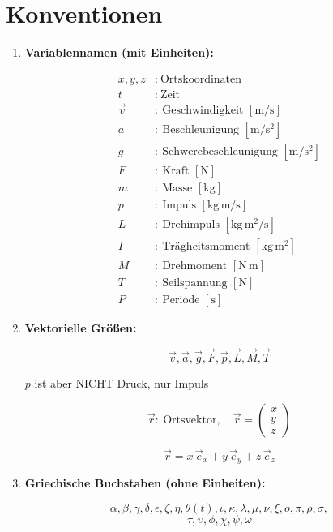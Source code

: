 \documentclass[a4paper,12pt]{article}
\begin{document}
\section*{Konventionen}

\begin{enumerate}

\item \textbf{Variablennamen (mit Einheiten):}

\begin{align*}
x, y, z &:\ \text{Ortskoordinaten} \\[4pt]
t &:\ \text{Zeit} \\[4pt]
\vec{v} &:\ \text{Geschwindigkeit } [\mathrm{m/s}] \\[4pt]
a &:\ \text{Beschleunigung } [\mathrm{m/s^2}] \\[4pt]
g &:\ \text{Schwerebeschleunigung } [\mathrm{m/s^2}] \\[4pt]
F &:\ \text{Kraft } [\mathrm{N}] \\[4pt]
m &:\ \text{Masse } [\mathrm{kg}] \\[4pt]
p &:\ \text{Impuls } [\mathrm{kg\,m/s}] \\[4pt]
L &:\ \text{Drehimpuls } [\mathrm{kg\,m^2/s}] \\[4pt]
I &:\ \text{Trägheitsmoment } [\mathrm{kg\,m^2}] \\[4pt]
M &:\ \text{Drehmoment } [\mathrm{N\,m}] \\[4pt]
T &:\ \text{Seilspannung } [\mathrm{N}] \\[4pt]
P &:\ \text{Periode } [\mathrm{s}]
\end{align*}

\item \textbf{Vektorielle Größen:}

\[
\vec{v}, \vec{a}, \vec{g}, \vec{F}, \vec{p}, \vec{L}, \vec{M}, \vec{T}
\]

$p$ ist aber NICHT Druck, nur Impuls

\[
\vec{r}:\ \text{Ortsvektor}, \quad 
\vec{r} =
\begin{pmatrix}
x \\ y \\ z
\end{pmatrix}
\]

\[
\vec{r} = x\,\vec{e}_x + y\,\vec{e}_y + z\,\vec{e}_z
\]

\item \textbf{Griechische Buchstaben (ohne Einheiten):}

\[
\alpha, \beta, \gamma, \delta, \epsilon, \zeta, \eta, \theta(t), \iota, \kappa, \lambda, \mu, \nu, \xi, o, \pi, \rho, \sigma,
\]
\[
\tau, \upsilon, \phi, \chi, \psi, \omega
\]


\end{enumerate}
\end{document}
